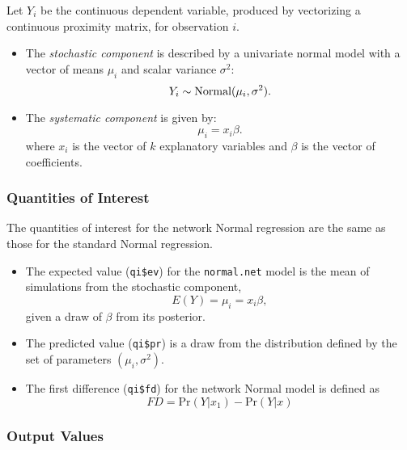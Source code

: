 Let $Y_{i}$ be the continuous dependent variable, produced by vectorizing a continuous proximity matrix, for observation $i$.  
\begin{itemize}
\item The \emph{stochastic component} is described by a univariate normal model with a vector of means $\mu_i$ and scalar variance $\sigma^2$: 
\begin{equation*}
Y_{i}  \sim \text{Normal} ( \mu_{i}, \sigma^2).\\
\end{equation*}
\item The \emph{systematic component} is given by:
\begin{equation*}
\mu_i = x_i\beta.
\end{equation*}
where $ x_i$ is the vector of $k$ explanatory variables and $\beta$ is the vector of coefficients.
\end{itemize}


\subsubsection{Quantities of Interest}
The quantities of interest for the network Normal regression are the same as those for the standard Normal regression. 
\begin{itemize}
\item The expected value ({\tt qi\$ev}) for the {\tt normal.net} model is the mean of simulations from the stochastic component,  
\begin{equation*}
E(Y) = \mu_{i} =  x_{i}\beta,
\end{equation*}
given a draw of $\beta$ from its posterior.

\item The predicted value ({\tt qi\$pr}) is a draw from the distribution defined by the set of parameters $(\mu_i, \sigma^2)$. 

\item The first difference ({\tt qi\$fd}) for the network Normal model is defined as 
\begin{equation*}
FD = \text{Pr}(Y| x_{1}) - \text{Pr}(Y| x)
\end{equation*}
\end{itemize}


\subsubsection{Output Values}

